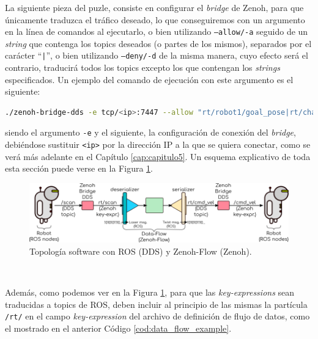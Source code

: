 La siguiente pieza del puzle, consiste en configurar el \textit{bridge} de
Zenoh, para que únicamente traduzca el tráfico deseado, lo que conseguiremos con
un argumento en la línea de comandos al ejecutarlo, o bien utilizando
\texttt{--allow/-a} seguido de un \textit{string} que contenga los topics
deseados (o partes de los mismos), separados por el carácter ``\texttt{|}'', o
bien utilizando \texttt{--deny/-d} de la misma manera, cuyo efecto será el
contrario, traducirá todos los topics excepto los que contengan los
\textit{strings} especificados.
Un ejemplo del comando de ejecución con este argumento es el siguiente:
\begin{lstlisting}[language=bash]
  ./zenoh-bridge-dds -e tcp/<ip>:7447 --allow "rt/robot1/goal_pose|rt/chatter"
\end{lstlisting}
siendo el argumento \texttt{-e} y el siguiente, la configuración de conexión del
\textit{bridge}, debiéndose sustituir \verb|<ip>| por la dirección IP a la que
se quiera conectar, como se verá más adelante en el Capítulo
\ref{cap:capitulo5}.
Un esquema explicativo de toda esta sección puede verse en la Figura
\ref{fig:zenoh_dds_topology}.

\begin{figure} [h!]
  \begin{center}
    \includegraphics[width=15cm]{figs/zenoh_dds_topology}
  \end{center}
  \caption{Topología software con ROS (DDS) y Zenoh-Flow (Zenoh).}
  \label{fig:zenoh_dds_topology}
\end{figure}\

Además, como podemos ver en la Figura \ref{fig:zenoh_dds_topology}, para que las
\textit{key-expressions} sean traducidas a topics de ROS, deben incluir al
principio de las mismas la partícula \verb|/rt/| en el campo
\textit{key-expression} del archivo de definición de flujo de datos, como el
mostrado en el anterior Código \ref{cod:data_flow_example}.










